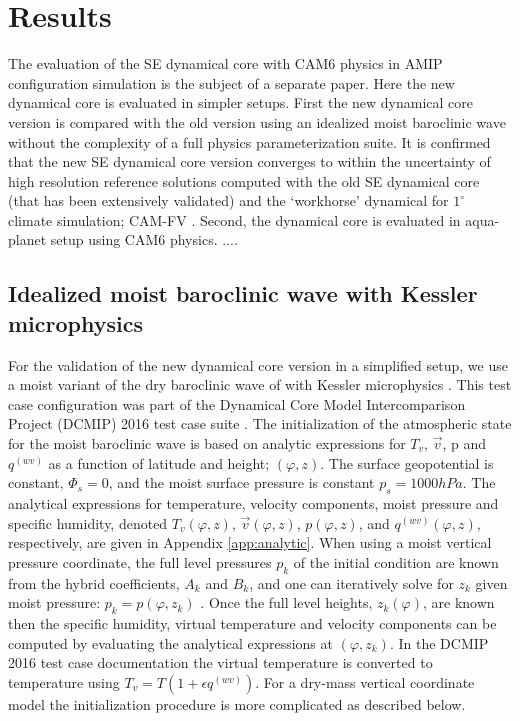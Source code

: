 \documentclass{agujournal}
\begin{document}
\section{Results}\label{sec:results}
The evaluation of the SE dynamical core with CAM6 physics in AMIP configuration simulation is the subject of a separate paper. Here the new dynamical core is evaluated in simpler setups. First the new dynamical core version is compared with the old version using an idealized moist baroclinic wave without the complexity of a full physics parameterization suite. It is confirmed that the new SE dynamical core version converges to within the uncertainty of high resolution reference solutions computed with the old SE dynamical core (that has been extensively validated) and the `workhorse' dynamical for $1^\circ$ climate simulation; CAM-FV \citep[finit-volume][]{L2004MWR}. Second, the dynamical core is evaluated in aqua-planet setup \citep{NH2000ASL,WetAl2012NCAR,MWO2016JAMES} using CAM6 physics. .... {\color{red}{[bla bla ...]}}
\subsection{Idealized moist baroclinic wave with Kessler microphysics}
For the validation of the new dynamical core version in a simplified setup, we use a moist variant of the dry baroclinic wave of \citet{UMJS2014QJRMS} with Kessler microphysics \citep{K1969MM}. This test case configuration was part of the Dynamical Core Model Intercomparison Project (DCMIP) 2016 test case suite {\color{red}{[DCMIP citation]}}. The initialization of the atmospheric state for the moist baroclinic wave is based on analytic expressions for $T_v$, $\vec{v}$, p and $q^{(wv)}$ as a function of latitude and height; $(\varphi,z)$. The surface geopotential is constant, $\Phi_s=0$, and the moist surface pressure is constant $p_s=1000hPa$. The analytical expressions for temperature, velocity components, moist pressure and specific humidity, denoted ${T_v}(\varphi,z)$, ${\vec{v}}(\varphi,z)$, ${p}(\varphi,z)$, and $q^{(wv)}(\varphi,z)$, respectively, are given in Appendix \ref{app:analytic}. When using a moist vertical pressure coordinate, the full level pressures $p_k$ of the initial condition are known from the hybrid coefficients, $A_k$ and $B_k$, and one can iteratively solve for $z_k$ given moist pressure: $p_k={p}(\varphi,z_k)$ \citep[see, ][]{UMJS2014QJRMS}. Once the full level heights, $z_k(\varphi)$, are known then the specific humidity, virtual temperature and velocity components can be computed by evaluating the analytical expressions at $(\varphi,z_k)$. In the DCMIP 2016 test case documentation the virtual temperature is converted to temperature using $T_v=T\left( 1+\epsilon q^{(wv)}\right)$. For a dry-mass vertical coordinate model the initialization procedure is more complicated as described below.
\end{document}
